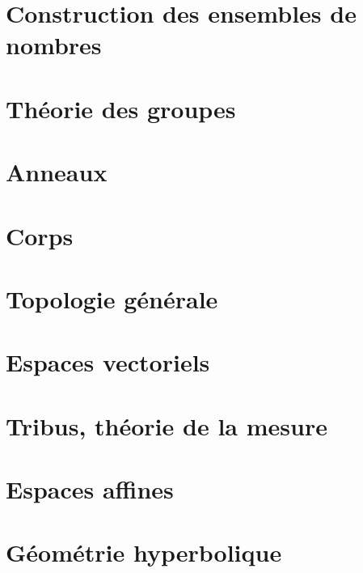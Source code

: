 \chapter{Construction des ensembles de nombres}


\chapter{Théorie des groupes}



\chapter{Anneaux}


\chapter{Corps}






\chapter{Topologie générale}



\chapter{Espaces vectoriels}










\chapter{Tribus, théorie de la mesure}





\chapter{Espaces affines}


\chapter{Géométrie hyperbolique}


